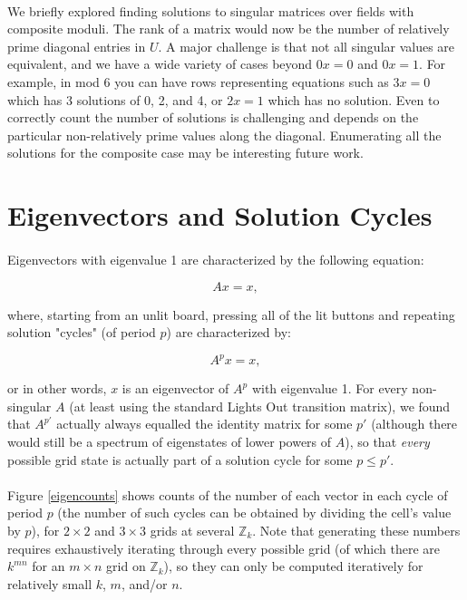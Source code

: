 \documentclass[11pt]{article}
\newcommand{\modZ}[1]{$\mathbb{Z}_{#1}$}
\begin{document}
\paragraph{} We briefly explored finding solutions to singular matrices over fields with composite moduli.  The rank of a matrix would now be the number of relatively prime diagonal entries in $U$.  A major challenge is that not all singular values are equivalent, and we have a wide variety of cases beyond $0x = 0$ and $0x =1$.  For example, in mod 6 you can have rows representing equations such as $3x = 0$ which has 3 solutions of 0, 2, and 4, or $2x = 1$ which has no solution.  Even to correctly count the number of solutions is challenging and depends on the particular non-relatively prime values along the diagonal.  Enumerating all the solutions for the composite case may be interesting future work.

\section*{Eigenvectors and Solution Cycles}

\paragraph{} Eigenvectors with eigenvalue 1 are characterized by the following equation:

\begin{equation}
Ax = x,
\end{equation}

\noindent where, starting from an unlit board, pressing all of the lit buttons and repeating solution "cycles" (of period $p$) are characterized by:

\begin{equation}
A^px = x,
\end{equation}

\noindent or in other words, $x$ is an eigenvector of $A^p$ with eigenvalue 1. For every non-singular $A$ (at least using the standard Lights Out transition matrix), we found that $A^{p'}$ actually always equalled the identity matrix for some $p'$ (although there would still be a spectrum of eigenstates of lower powers of $A$), so that \textit{every} possible grid state is actually part of a solution cycle for some $p \leq p'$.

\paragraph{} Figure \ref{eigencounts} shows counts of the number of each vector in each cycle of period $p$ (the number of such cycles can be obtained by dividing the cell's value by $p$), for $2 \times 2$ and $3 \times 3$ grids at several \modZ{k}. Note that generating these numbers requires exhaustively iterating through every possible grid (of which there are $k^{mn}$ for an $m \times n$ grid on \modZ{k}), so they can only be computed iteratively for relatively small $k$, $m$, and/or $n$.
\end{document}
